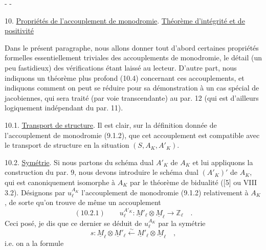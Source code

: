 \begin{center}-  -\end{center}
10. \uline{Propriétés de l'accouplement de monodromie}. \uline{Théorème d'intégrité et de positivité}

Dans le présent paragraphe, nous allons donner tout d'abord certaines propriétés formelles essentiellement triviales des accouplements de monodromie, le détail (un peu fastidieux) des vérifications étant laissé au lecteur. D'autre part, nous indiquons un théorème plus profond (10.4) concernant ces accouplements, et indiquons comment on peut se réduire pour sa démonstration à un cas spécial de jacobiennes, qui sera traité (par voie transcendante) au par. 12 (qui est d'ailleurs logiquement indépendant du par. 11).

10.1. \uline{Transport de structure}. Il est clair, sur la définition donnée de l'accouplement de monodromie (9.1.2), que cet accouplement est compatible avec le transport de structure en la situation $(S,A_K,A'_K)$.

10.2. \uline{Symétrie}. Si nous partons du schéma dual $A'_K$ de $A_K$ et lui appliquons la construction du par. 9, nous devons introduire le schéma dual $(A'_K)'$ de $A_K$, qui est canoniquement isomorphe à $A_K$ par le théorème de bidualité ([5] ou VIII 3.2). Désignons par $u_\ell^{A_K}$ l'accouplement de monodromie (9.1.2) relativement à $A_K$, de sorte qu'on trouve de même un accouplement
\[
(10.2.1)\qquad u_\ell^{A'_K}:\underline M'_\ell\otimes\underline M_\ell\longrightarrow\mathbb Z_\ell\quad.
\]
Ceci posé, je dis que ce dernier se déduit de $u_\ell^{A_K}$ par la symétrie
\[
s:\underline M_\ell\otimes\underline M'_\ell\xleftarrow{\sim}\underline M'_\ell\otimes\underline M_\ell\quad,
\]
i.e. on a la formule
